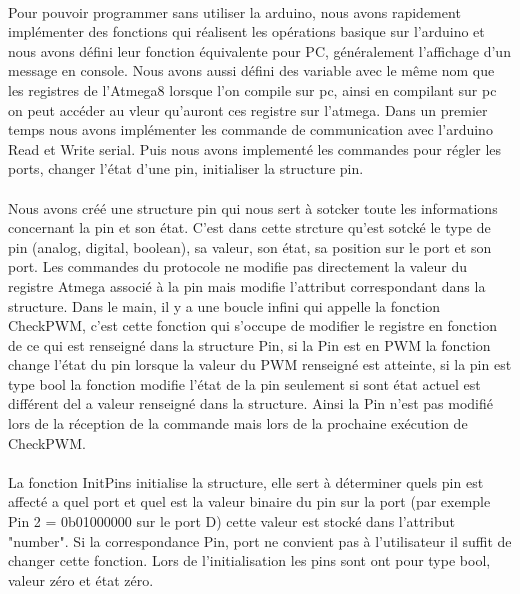 \paragraph{}
Pour pouvoir programmer sans utiliser la arduino, nous avons rapidement implémenter des fonctions qui réalisent les opérations basique sur l'arduino et nous avons défini leur fonction équivalente pour PC, généralement l'affichage d'un message en console. Nous avons aussi défini des variable avec le même nom que les registres de l'Atmega8 lorsque l'on compile sur pc, ainsi en compilant sur pc on peut accéder au vleur qu'auront ces registre sur l'atmega.
Dans un premier temps nous avons implémenter les commande de communication avec l'arduino Read et Write serial. Puis nous avons implementé les commandes pour régler les ports, changer l'état d'une pin, initialiser la structure pin.

\paragraph{}
Nous avons créé une structure pin qui nous sert à sotcker toute les informations concernant la pin et son état. C'est dans cette strcture qu'est sotcké le type de pin (analog, digital, boolean), sa valeur, son état, sa position sur le port et son port. Les commandes du protocole ne modifie pas directement la valeur du registre Atmega associé à la pin mais modifie l'attribut correspondant dans la structure. Dans le main, il y a une boucle infini qui appelle la fonction CheckPWM, c'est cette fonction qui s'occupe de modifier le registre en fonction de ce qui est renseigné dans la structure Pin, si la Pin est en PWM la fonction change l'état du pin lorsque la valeur du PWM renseigné est atteinte, si la pin est type bool la fonction modifie l'état de la pin seulement si sont état actuel est différent del a valeur renseigné dans la structure. Ainsi la Pin n'est pas modifié lors de la réception de la commande mais lors de la prochaine exécution de CheckPWM.

\paragraph{}
La fonction InitPins initialise la structure, elle sert à déterminer quels pin est affecté a quel port et quel est la valeur binaire du pin sur la port (par exemple Pin 2 = 0b01000000 sur le port D) cette valeur est stocké dans l'attribut "number". Si la correspondance Pin, port ne convient pas à l'utilisateur il suffit de changer cette fonction. Lors de l'initialisation les pins sont ont pour type bool, valeur zéro et état zéro.

